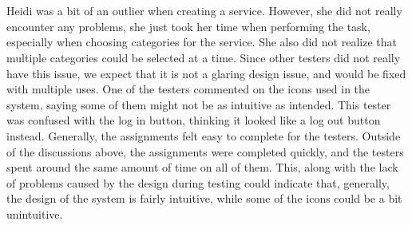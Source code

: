 \\\\
Heidi was a bit of an outlier when creating a service.
However, she did not really encounter any problems, she just took her time when performing the task, especially when choosing categories for the service.
She also did not realize that multiple categories could be selected at a time.
Since other testers did not really have this issue, we expect that it is not a glaring design issue, and would be fixed with multiple uses.
One of the testers commented on the icons used in the system, saying some of them might not be as intuitive as intended.
This tester was confused with the log in button, thinking it looked like a log out button instead.
Generally, the assignments felt easy to complete for the testers.
Outside of the discussions above, the assignments were completed quickly, and the testers spent around the same amount of time on all of them.
This, along with the lack of problems caused by the design during testing could indicate that, generally, the design of the system is fairly intuitive, while some of the icons could be a bit unintuitive. 

